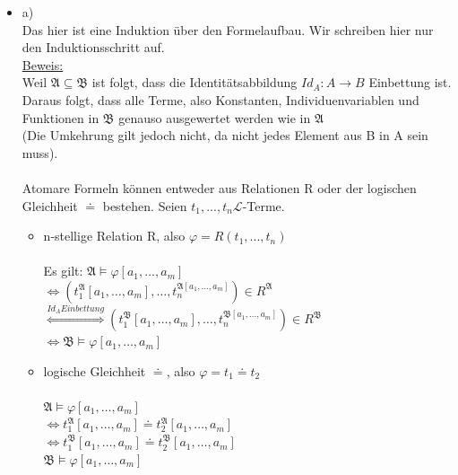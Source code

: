 \documentclass[a4paper]{scrartcl}
\begin{document}
    \begin{itemize}
        \item a)\\
            Das hier ist eine Induktion über den Formelaufbau. Wir schreiben hier nur den Induktionsschritt auf.\\

            \underline{Beweis:}\\ 
            Weil $\mathfrak{A} \subseteq \mathfrak{B}$ ist folgt, dass die Identitätsabbildung $Id_A: A \rightarrow B$ Einbettung ist.\\
            Daraus folgt, dass alle Terme, also Konstanten, Individuenvariablen und Funktionen in $\mathfrak{B}$ genauso ausgewertet werden wie in $\mathfrak{A}$\\
            (Die Umkehrung gilt jedoch nicht, da nicht jedes Element aus B in A sein muss).\\

            \\Atomare Formeln können entweder aus Relationen R oder der logischen Gleichheit $\doteq$ bestehen. Seien $t_1,...,t_n \mathscr{L}$-Terme.\\
            
            \begin{itemize}
                \item n-stellige Relation R, also $\varphi = R(t_1,...,t_n)$\\
                    \\Es gilt: $\mathfrak{A} \models \varphi[a_1,\dots,a_m]$\\
                    $\Leftrightarrow (t_1^{\mathfrak{A}}[a_1,\dots,a_m],\dots,t_n^{\mathfrak{A}[a_1,\dots,a_m]}) \in R^{\mathfrak{A}}$\\
                    $\overset{Id_A Einbettung}{\Leftrightarrow} (t_1^{\mathfrak{B}}[a_1,\dots,a_m],\dots,t_n^{\mathfrak{B}[a_1,\dots,a_m]}) \in R^{\mathfrak{B}}$\\
                    $\Leftrightarrow \mathfrak{B} \models \varphi[a_1,\dots,a_m]$\\
                
                \item logische Gleichheit $\doteq$, also $\varphi = t_1 \doteq t_2$\\
                    \\$\mathfrak{A} \models \varphi[a_1,\dots,a_m]$\\
                    $\Leftrightarrow t_1^{\mathfrak{A}}[a_1,\dots,a_m] \doteq t_2^{\mathfrak{A}}[a_1,\dots,a_m]$\\
                    $\Leftrightarrow t_1^{\mathfrak{B}}[a_1,\dots,a_m] \doteq t_2^{\mathfrak{B}}[a_1,\dots,a_m]$\\
                    $\mathfrak{B} \models \varphi[a_1,\dots,a_m]$\\


\end{itemize}
\end{itemize}
\end{document}
